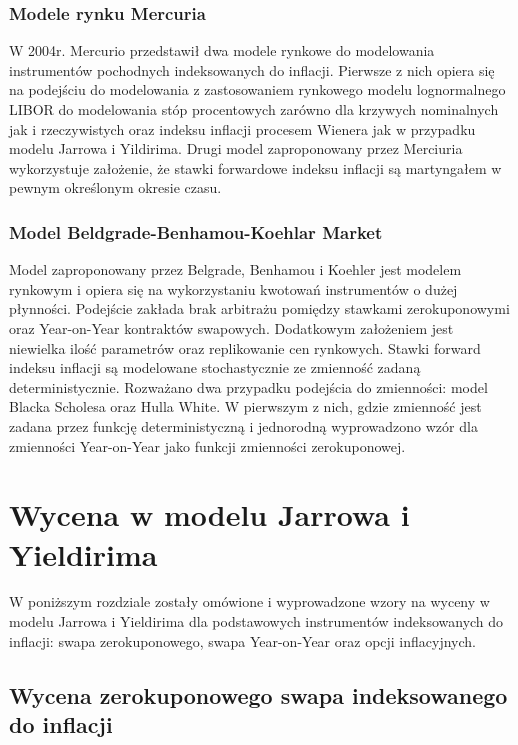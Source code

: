 \documentclass{mini}
\theoremstyle{mythstyle}
\begin{document}
\subsection{Modele rynku Mercuria}
W 2004r. Mercurio przedstawił dwa modele rynkowe do modelowania instrumentów pochodnych indeksowanych do inflacji.  Pierwsze z nich opiera się na  podejściu do modelowania z zastosowaniem rynkowego modelu lognormalnego LIBOR do modelowania stóp procentowych zarówno dla krzywych nominalnych jak i rzeczywistych oraz indeksu inflacji procesem Wienera jak w przypadku modelu Jarrowa i Yildirima. Drugi model zaproponowany przez Merciuria wykorzystuje założenie, że stawki forwardowe indeksu inflacji są martyngałem w pewnym określonym okresie czasu.



\subsection{Model Beldgrade-Benhamou-Koehlar Market}	
Model zaproponowany przez Belgrade, Benhamou i Koehler jest modelem rynkowym i opiera się na wykorzystaniu kwotowań instrumentów o dużej płynności. Podejście zakłada brak arbitrażu pomiędzy stawkami zerokuponowymi oraz Year-on-Year kontraktów swapowych. Dodatkowym założeniem jest niewielka ilość parametrów oraz replikowanie cen rynkowych. Stawki forward indeksu inflacji są modelowane stochastycznie ze zmienność zadaną deterministycznie. Rozważano dwa przypadku podejścia do zmienności: model Blacka Scholesa oraz Hulla White. W pierwszym z nich, gdzie zmienność jest zadana przez funkcję deterministyczną i jednorodną wyprowadzono wzór dla zmienności Year-on-Year jako funkcji zmienności zerokuponowej.



	\chapter{Wycena w modelu Jarrowa i Yieldirima}
	
	W poniższym rozdziale zostały omówione i wyprowadzone wzory na wyceny w modelu Jarrowa i Yieldirima dla podstawowych instrumentów indeksowanych do inflacji: swapa zerokuponowego, swapa Year-on-Year oraz opcji inflacyjnych.
		
	\section{Wycena zerokuponowego swapa indeksowanego do inflacji}
	
\end{document}
